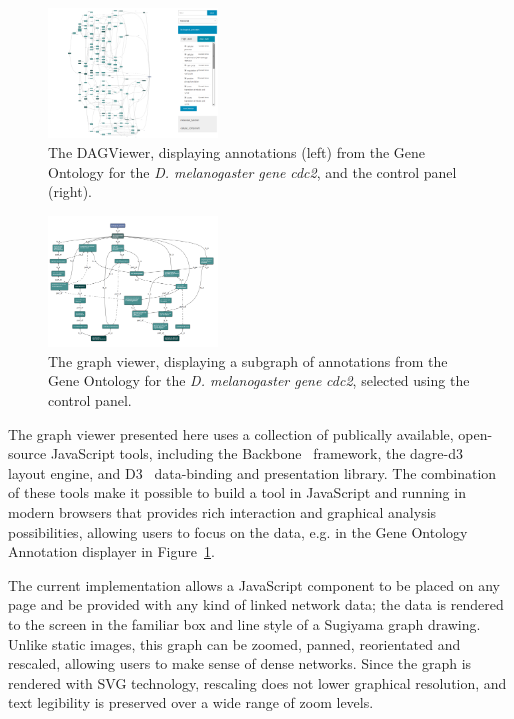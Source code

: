 \documentclass[10pt,a4paper,twocolumn]{article}
\begin{document}
\begin{figure}[htb]
\centering
\includegraphics[width=0.4\textwidth]{dagify.png}
\caption{
    \label{fig:1}
    The DAGViewer, displaying annotations (left) from the Gene Ontology for
    the \textit{D. melanogaster gene} \emph{cdc2}, and the control panel (right).
}
\end{figure}

\begin{figure}[htb]
\centering
\includegraphics[width=0.4\textwidth]{dagify-subgraph.png}
\caption{
  \label{fig:2}
  The graph viewer, displaying a subgraph of annotations from the Gene Ontology
  for the \textit{D. melanogaster gene} \emph{cdc2}, selected using the control panel.
}
\end{figure}

The graph viewer presented here uses a collection of publically available,
open-source JavaScript tools, including the Backbone~\cite{backbone} framework,
the dagre-d3~\cite{dagre-d3} layout engine, and D3~\cite{d3} data-binding and
presentation library. The combination of these tools make it possible to build a
tool in JavaScript and running in modern browsers that provides rich interaction
and graphical analysis possibilities, allowing users to focus on the data, e.g.
in the Gene Ontology Annotation displayer in Figure~\ref{fig:1}.

The current implementation allows a JavaScript component to be placed on any
page and be provided with any kind of linked network data; the data is rendered
to the screen in the familiar box and line style of a Sugiyama graph drawing.
Unlike static images, this graph can be zoomed, panned, reorientated and
rescaled, allowing users to make sense of dense networks. Since the graph is
rendered with SVG technology, rescaling does not lower graphical resolution, and
text legibility is preserved over a wide range of zoom levels.
\end{document}
